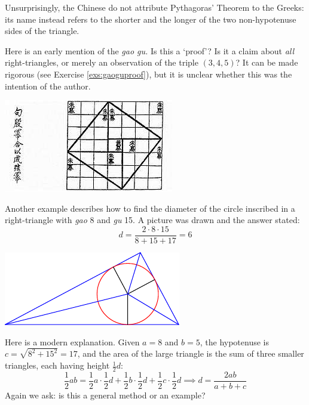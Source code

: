 Unsurprisingly, the Chinese do not attribute Pythagoras' Theorem to the Greeks: its name instead refers to the shorter and the longer of the two non-hypotenuse sides of the triangle.\par
\begin{minipage}[t]{0.52\linewidth}\vspace{0pt}
	Here is an early mention of the \emph{gao gu.} Is this a `proof'? Is it a claim about \emph{all} right-triangles, or merely an observation of the triple $(3,4,5)$? It can be made rigorous (see Exercise \ref{exs:gaoguproof}), but it is unclear whether this was the intention of the author.
\end{minipage}
\hfill
\begin{minipage}[t]{0.44\linewidth}\vspace{0pt}
	\flushright\includegraphics[scale=0.75]{Chinese_pythagoras.jpg}
\end{minipage}\bigbreak


\begin{minipage}[t]{0.68\linewidth}\vspace{0pt}
	Another example describes how to find the diameter of the circle inscribed in a right-triangle with \emph{gao} 8 and \emph{gu} 15.
	A picture was drawn and the answer stated:
	\[
		d=\frac{2\cdot 8\cdot 15}{8+15+17}=6
	\]
\end{minipage}
\hfill
\begin{minipage}[t]{0.3\linewidth}\vspace{0pt}
	\flushright\includegraphics{china-inscribed}
\end{minipage}\medbreak
Here is a modern explanation. Given $a=8$ and $b=5$, the hypotenuse is $c=\sqrt{8^2+15^2}=17$, and the area of the large triangle is the sum of three smaller triangles, each having height $\frac 12 d$:
\[
	\frac 12 ab=\frac 12a\cdot\frac 12d+\frac 12b\cdot \frac 12d+\frac 12c\cdot\frac 12d
	\implies d=\frac{2ab}{a+b+c}
\]
Again we ask: is this a general method or an example?

